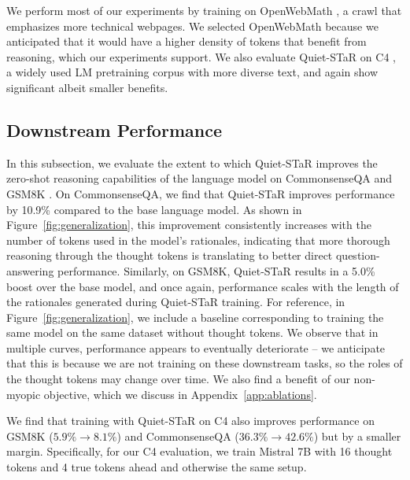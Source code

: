 \documentclass{article} %
\begin{document}
 We perform most of our experiments by training on OpenWebMath \citep{paster2023openwebmath}, a crawl that emphasizes more technical webpages. We selected OpenWebMath because we anticipated that it would have a higher density of tokens that benefit from reasoning, which our experiments support. We also evaluate Quiet-STaR on C4 \citep{raffel2020exploring}, a widely used LM pretraining corpus with more diverse text, and again show significant albeit smaller benefits.


\subsection{Downstream Performance}
In this subsection, we evaluate the extent to which Quiet-STaR improves the zero-shot reasoning capabilities of the language model on CommonsenseQA \citep{talmor2018commonsenseqa} and GSM8K \citep{cobbe_training_2021}. On CommonsenseQA, we find that Quiet-STaR improves performance by 10.9\% compared to the base language model. As shown in Figure~\ref{fig:generalization}, this improvement consistently increases with the number of tokens used in the model's rationales, indicating that more thorough reasoning through the thought tokens is translating to better direct question-answering performance. Similarly, on GSM8K, Quiet-STaR results in a 5.0\% boost over the base model, and once again, performance scales with the length of the rationales generated during Quiet-STaR training. For reference, in Figure~\ref{fig:generalization}, we include a baseline corresponding to training the same model on the same dataset without thought tokens. 
We observe that in multiple curves, performance appears to eventually deteriorate -- we anticipate that this is because we are not training on these downstream tasks, so the roles of the thought tokens may change over time. We also find a benefit of our non-myopic objective, which we discuss in Appendix~\ref{app:ablations}.

We find that training with Quiet-STaR on C4 \citep{raffel2020exploring} also improves performance on GSM8K ($5.9\% \rightarrow 8.1\%$) and CommonsenseQA ($36.3\% \rightarrow 42.6\%$) but by a smaller margin. Specifically, for our C4 evaluation, we train Mistral 7B with 16 thought tokens and 4 true tokens ahead and otherwise the same setup. 
\end{document}
